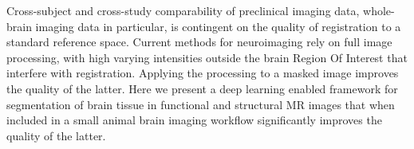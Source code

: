Cross-subject and cross-study comparability of preclinical imaging data, whole-brain imaging 
data in particular, is contingent on the quality of registration to a standard reference space.
Current methods for neuroimaging rely on full image processing, with high varying intensities outside the brain Region Of Interest that interfere with registration.
Applying the processing to a masked image improves the quality of the latter.
Here we present a deep learning enabled framework for segmentation of brain tissue in functional and structural MR images that when included in a small animal brain imaging workflow significantly improves the quality of the latter.



